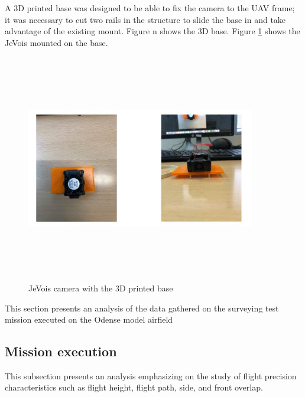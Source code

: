 A 3D printed base was designed to be able to fix the camera to the UAV frame; it was necessary to cut two rails in the structure to slide the base in and take advantage of the existing mount. Figure n shows the 3D base. Figure \ref{fig:base} shows the JeVois mounted on the base.
\begin{figure}[H]
\centering
\includegraphics[width=10cm,height=10cm,keepaspectratio]{imagenes/Base.jpg}
\caption{JeVois camera with the 3D printed base}
\label{fig:base}
\end{figure}

This section presents an analysis of the data gathered on the surveying test mission executed on the Odense model airfield
\subsection{Mission execution}
This subsection presents an analysis emphasizing on the study of flight precision characteristics such as flight height, flight path, side, and front overlap. 
